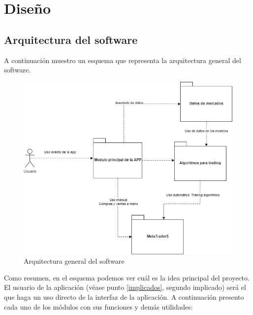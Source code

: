 
\chapter{Diseño}


\section{Arquitectura del software}

A continuación muestro un esquema que representa la arquitectura general del software.\newline


\begin{figure}[h]
	\includegraphics[width=1\textwidth]{imagenes/arquitectura general.png}
	\caption{Arquitectura general del software}
\end{figure}


Como resumen, en el esquema podemos ver cuál es la idea principal del proyecto. El usuario de la aplicación (véase punto \ref{implicados}, segundo implicado) será el que haga un uso directo de la interfaz de la aplicación. A continuación presento cada uno de los módulos con sus funciones y demás utilidades:

